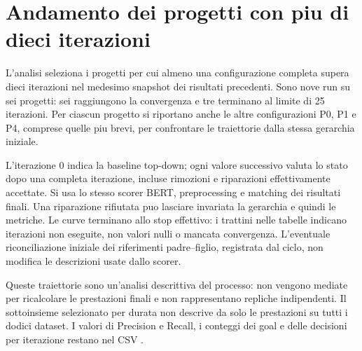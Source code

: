 \section{Andamento dei progetti con piu di dieci iterazioni}
\label{sec:results-iteration-trends}
L'analisi seleziona i progetti per cui almeno una configurazione completa
supera dieci iterazioni nel medesimo snapshot dei risultati precedenti.
Sono nove run su sei progetti: sei raggiungono la convergenza e tre
terminano al limite di 25 iterazioni. Per ciascun progetto si riportano
anche le altre configurazioni P0, P1 e P4, comprese quelle piu brevi,
per confrontare le traiettorie dalla stessa gerarchia iniziale.

L'iterazione 0 indica la baseline top-down; ogni valore successivo valuta
lo stato dopo una completa iterazione, incluse rimozioni e riparazioni
effettivamente accettate. Si usa lo stesso scorer BERT, preprocessing e
matching dei risultati finali. Una riparazione rifiutata puo lasciare
invariata la gerarchia e quindi le metriche. Le curve terminano allo stop
effettivo: i trattini nelle tabelle indicano iterazioni non eseguite,
non valori nulli o mancata convergenza.
L'eventuale riconciliazione iniziale dei riferimenti padre--figlio,
registrata dal ciclo, non modifica le descrizioni usate dallo scorer.

Queste traiettorie sono un'analisi descrittiva del processo: non vengono
mediate per ricalcolare le prestazioni finali e non rappresentano repliche
indipendenti. Il sottoinsieme selezionato per durata non descrive da solo
le prestazioni su tutti i dodici dataset. I valori di Precision e Recall,
i conteggi dei goal e delle decisioni per iterazione restano nel CSV
.

\clearpage
